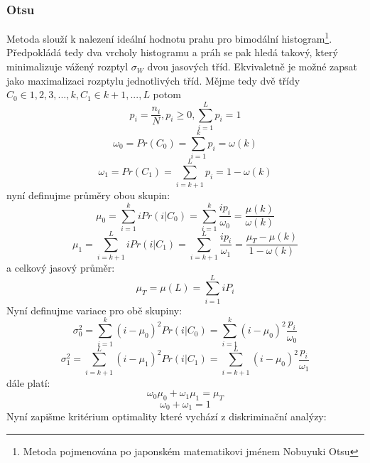 \documentclass{thesis}%
\begin{document}
\subsubsection{Otsu}
Metoda slouží k nalezení ideální hodnotu prahu pro bimodální histogram\footnote[13]{Metoda pojmenována po japonském matematikovi jménem Nobuyuki Otsu}. Předpokládá tedy dva vrcholy histogramu a práh se pak hledá takový, který minimalizuje vážený rozptyl $\sigma_W$  dvou jasových tříd. Ekvivaletně je možné zapsat jako maximalizaci rozptylu jednotlivých tříd. Mějme tedy dvě třídy $C_0 \in {1,2,3,...,k}, C_1 \in {k+1, ...,L}$ potom
\begin{equation}
p_i = \frac{n_i}{N}, p_i \geq 0,  \sum\limits_{i=1}^Lp_i = 1
\end{equation}
\begin{equation}
\omega_0 = Pr(C_0) =  \sum\limits_{i=1}^k p_i =\omega(k)
\end{equation}
\begin{equation}
\omega_1 = Pr(C_1) =  \sum\limits_{i=k+1}^L p_i =1-\omega(k)
\end{equation}
nyní definujme průměry obou skupin:
\begin{equation}
\mu_0 =  \sum\limits_{i=1}^k iPr(i|C_0) = \sum\limits_{i=1}^k \frac{ip_i}{\omega_0} = \frac{\mu(k)}{\omega(k)}
\end{equation}
\begin{equation}
\mu_1 =  \sum\limits_{i=k+1}^L iPr(i|C_1) = \sum\limits_{i=k+1}^L \frac{ip_i}{\omega_1} = \frac{\mu_T - \mu(k)}{1-\omega(k)}
\end{equation}
a celkový jasový průměr:
\begin{equation}
\mu_T = \mu(L) = \sum\limits_{i=1}^L iP_i
\end{equation}
Nyní definujme variace pro obě skupiny:
\begin{equation}
\sigma_0^2 = \sum\limits_{i=1}^k (i-\mu_0)^2Pr(i|C_0) = \sum\limits_{i=1}^k(i-\mu_0)^2\frac{p_i}{\omega_0}
\end{equation}
\begin{equation}
\sigma_1^2 = \sum\limits_{i=k+1}^L (i-\mu_1)^2Pr(i|C_1) = \sum\limits_{i=k+1}^L(i-\mu_0)^2\frac{p_i}{\omega_1}
\end{equation}
dále platí:
\begin{equation}
\omega_0\mu_0+\omega_1\mu_1=\mu_T
\end{equation}
\begin{equation}
\omega_0+\omega_1 = 1
\end{equation}
Nyní zapišme kritérium optimality které vychází z diskriminační analýzy:
\end{document}
